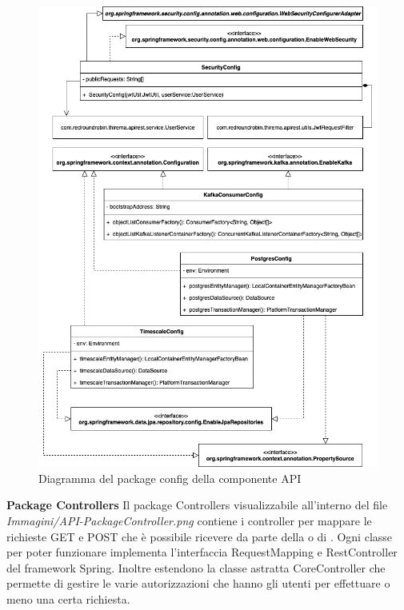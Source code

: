 		\begin{figure}[H]
			\centering
			\includegraphics[scale=0.550]{res/images/API/ConfigPackage.png}
			\caption{Diagramma del package config della componente API}
			\label{Diagramma 12}
		\end{figure}
		\newpage
		\textbf{Package Controllers}
		\newline\newline
		Il package Controllers visualizzabile all'interno del file \textit{Immagini/API-PackageController.png} contiene i controller per mappare le richieste GET e POST che è possibile ricevere da parte della  o di \glock{Telegram}.
		\newline
		Ogni classe per poter funzionare implementa l'interfaccia RequestMapping e RestController del framework Spring. Inoltre estendono la classe astratta CoreController che permette di gestire le varie autorizzazioni che hanno gli utenti per effettuare o meno una certa richiesta.
